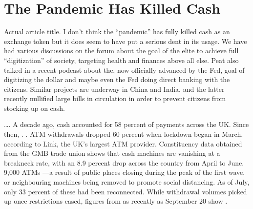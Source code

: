 \chapter{The Pandemic Has Killed Cash}

\begin{refsection}

Actual article title. I don't think the \enquote{pandemic} has fully killed cash as an exchange token but it does seem to have put a serious dent in its usage. We have had various discussions on the forum about the goal of the elite to achieve full \enquote{digitization} of society, targeting health and finances above all else. Peat also talked in a recent podcast about the, now officially advanced by the Fed, goal of digitizing the dollar and maybe even the Fed doing direct banking with the citizens. Similar projects are underway in China and India, and the latter recently nullified large bills in circulation in order to prevent citizens from stocking up on cash.\textsuperscript{\cite{url5129e82a, url81b31497, url99170cb8}}

\begin{tcolorbox}[quote]

\dots{}. A decade ago, cash accounted for 58 percent of payments\textsuperscript{\cite{url595bd945}} across the UK. Since then, . . ATM withdrawals dropped 60 percent\textsuperscript{\cite{urlae506bee}} when lockdown began in March, according to Link, the UK's largest ATM provider. Constituency data obtained from the GMB trade union shows that cash machines are vanishing at a breakneck rate, with an 8.9 percent drop across the country from April to June.  9,000 ATMs\textsuperscript{\cite{url0f0199f9}} ---a result of public places closing during the peak of the first wave, or neighbouring machines being removed to promote social distancing. As of July, only 33 percent of these had been reconnected. While withdrawal volumes picked up once restrictions eased, figures from as recently as September 20 show .\textsuperscript{\cite{urlb5e96eda}}

\end{tcolorbox}


\printbibliography[heading=subbibliography]

\end{refsection}